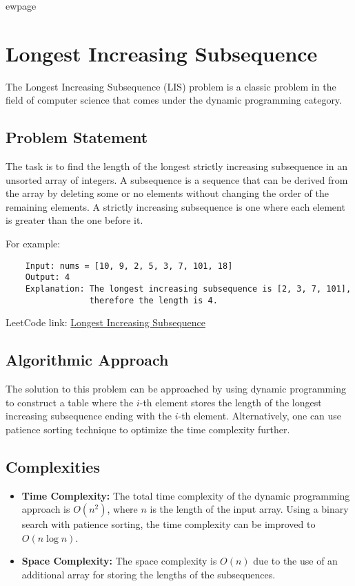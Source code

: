 
ewpage
\chapter{Longest Increasing Subsequence}
\label{chap:Longest_Increasing_Subsequence}

The Longest Increasing Subsequence (LIS) problem is a classic problem in the field of computer science that comes under the dynamic programming category.

\section*{Problem Statement}

The task is to find the length of the longest strictly increasing subsequence in an unsorted array of integers. A subsequence is a sequence that can be derived from the array by deleting some or no elements without changing the order of the remaining elements. A strictly increasing subsequence is one where each element is greater than the one before it.

For example:
\begin{verbatim}
    Input: nums = [10, 9, 2, 5, 3, 7, 101, 18]
    Output: 4
    Explanation: The longest increasing subsequence is [2, 3, 7, 101], 
                 therefore the length is 4.
\end{verbatim}

LeetCode link: \href{https://leetcode.com/problems/longest-increasing-subsequence/}{Longest Increasing Subsequence}

\section*{Algorithmic Approach}

The solution to this problem can be approached by using dynamic programming to construct a table where the \(i\)-th element stores the length of the longest increasing subsequence ending with the \(i\)-th element. Alternatively, one can use patience sorting technique to optimize the time complexity further.

\section*{Complexities}
\begin{itemize}
	\item \textbf{Time Complexity:} The total time complexity of the dynamic programming approach is \(O(n^2)\), where \(n\) is the length of the input array. Using a binary search with patience sorting, the time complexity can be improved to \(O(n \log n)\).
	\item \textbf{Space Complexity:} The space complexity is \(O(n)\) due to the use of an additional array for storing the lengths of the subsequences.
\end{itemize}


